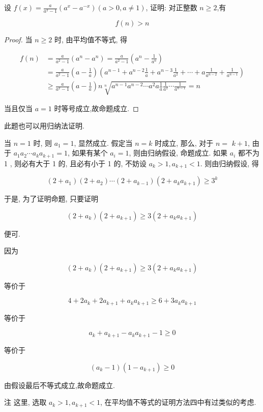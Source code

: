 \begin{example}
	设 $f(x)=\frac{a}{a^{2}-1}\left(a^{x}-a^{-x}\right)(a>0, a \neq 1)$, 证明: 对正整数 $n \geqslant 2$,有
	
	$$
	f(n)>n
	$$
\end{example}
\begin{proof}
	当 $n \geqslant 2$ 时, 由平均值不等式, 得
	
	$$
	\begin{aligned}
	f(n) & =\frac{a}{a^{2}-1}\left(a^{n}-a^{n}\right)=\frac{a}{a^{2}-1}\left(a^{n}-\frac{1}{a^{n}}\right) \\
	& =\frac{a}{a^{2}-1}\left(a-\frac{1}{a}\right)\left(a^{n-1}+a^{n-2} \frac{1}{a}+a^{n-3} \frac{1}{a^{2}}+\cdots+a \frac{1}{a^{n-2}}+\frac{1}{a^{n-1}}\right) \\
	& \geqslant \frac{a}{a^{2}-1}\left(a-\frac{1}{a}\right) n \sqrt[n]{a^{n-1} a^{n-2} \cdots a^{2} a \frac{1}{a} \frac{1}{a^{2}} \cdots \frac{1}{a^{n-1}}}=n
	\end{aligned}
	$$
	
	当且仅当 $a=1$ 时等号成立,故命题成立.
\end{proof}
\begin{note}
	此题也可以用归纳法证明.
	
	当 $n=1$ 时, 则 $a_{1}=1$, 显然成立. 假定当 $n=k$ 时成立, 那么, 对于 $n=$ $k+1$, 由于 $a_{1} a_{2} \cdots a_{k} a_{k+1}=1$, 如果有某个 $a_{i}=1$, 则由归纳假设, 命题成立. 如果 $a_{i}$ 都不为 1 , 则必有大于 1 的, 且必有小于 1 的, 不妨设 $a_{k}>1, a_{k+1}<1$. 则由归纳假设, 得
	
	$$
	\left(2+a_{1}\right)\left(2+a_{2}\right) \cdots\left(2+a_{k-1}\right)\left(2+a_{k} a_{k+1}\right) \geqslant 3^{k}
	$$
	
	于是, 为了证明命题, 只要证明
	
	$$
	\left(2+a_{k}\right)\left(2+a_{k+1}\right) \geqslant 3\left(2+a_{k} a_{k+1}\right)
	$$
	
	便可.
	
	因为
	
	$$
	\left(2+a_{k}\right)\left(2+a_{k+1}\right) \geqslant 3\left(2+a_{k} a_{k+1}\right)
	$$
	
	等价于
	
	$$
	4+2 a_{k}+2 a_{k+1}+a_{k} a_{k+1} \geqslant 6+3 a_{k} a_{k+1}
	$$
	
	等价于
	
	$$
	a_{k}+a_{k+1}-a_{k} a_{k+1}-1 \geqslant 0
	$$
	
	等价于
	
	$$
	\left(a_{k}-1\right)\left(1-a_{k+1}\right) \geqslant 0
	$$
	
	由假设最后不等式成立,故命题成立.
	
	注 这里, 选取 $a_{k}>1, a_{k+1}<1$, 在平均值不等式的证明方法四中有过类似的考虑.
\end{note}

